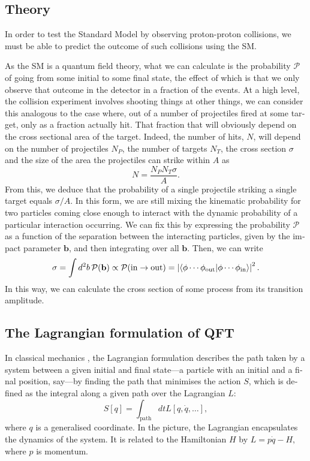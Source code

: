 

\begin{english}

\chapter{Theory}
In order to test the Standard Model by observing proton-proton collisions, we must be able to predict the outcome of such collisions using the SM.

As the SM is a quantum field theory, what we can calculate is the probability $\mathcal P$ of going from some initial to some final state, the effect of which is that we only observe that outcome in the detector in a fraction of the events. At a high level, the collision experiment involves shooting things at other things, we can consider this analogous to the case where, out of a number of projectiles fired at some target, only as a fraction actually hit. That fraction that will obviously depend on the cross sectional area of the target. Indeed, the number of hits, $N$, will depend on the number of projectiles $N_P$, the number of targets $N_T$, the cross section $\sigma$ and the size of the area the projectiles can strike within $A$ as
\[N=\frac{N_PN_T\sigma}{A}.\]
From this, we deduce that the probability of a single projectile striking a single target equals $\sigma/A$. In this form, we are still mixing the kinematic probability for two particles coming close enough to interact with the dynamic probability of a particular interaction occurring. We can fix this by expressing the probability $\mathcal P$ as a function of the separation between the interacting particles, given by the impact parameter $\mathbf b$, and then integrating over all $\mathbf b$. Then, we can write
\[\sigma=\int d^2b\,\mathcal P(\mathbf b)\propto\mathcal P(\text{in}\rightarrow\text{out})=\left|\left\langle\phi\cdots\phi_\text{out}\middle|\phi\cdots\phi_\text{in}\right\rangle\right|^2.\]
In this way, we can calculate the cross section of some process from its transition amplitude.

\section{The Lagrangian formulation of QFT}

In classical mechanics \cite{goldstein}, the Lagrangian formulation describes the path taken by a system between a given initial and final state---a particle with an initial and a final position, say---by finding the path that minimises the action $S$, which is defined as the integral along a given path over the Lagrangian $L$:
\[S[q]=\int_\textrm{path}dtL[q,\dot{q},\ldots],\]
where $q$ is a generalised coordinate. In the picture, the Lagrangian encapsulates the dynamics of the system. It is related to the Hamiltonian $H$ by
\(L = p\dot q- H,\label{htol}\)
where $p$ is momentum.


\end{english}
